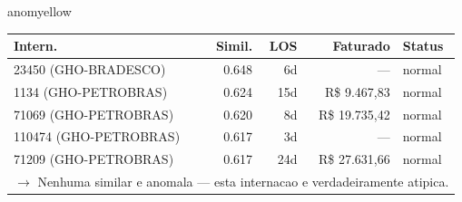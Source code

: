 \documentclass[a4paper,10pt]{article}
\begin{document}
\begin{anomalycard}[Internacao 105631 | GHO-PETROBRAS | MODERADO (z=2.13)]{anomyellow}
\begin{tabular}{l r r r l}\toprule\textbf{Intern.} & \textbf{Simil.} & \textbf{LOS} & \textbf{Faturado} & \textbf{Status} \\\midrule
23450 (GHO-BRADESCO) & 0.648 & 6d & --- & \textcolor{jcubeblue}{normal} \\
1134 (GHO-PETROBRAS) & 0.624 & 15d & R\$ 9.467,83 & \textcolor{jcubeblue}{normal} \\
71069 (GHO-PETROBRAS) & 0.620 & 8d & R\$ 19.735,42 & \textcolor{jcubeblue}{normal} \\
110474 (GHO-PETROBRAS) & 0.617 & 3d & --- & \textcolor{jcubeblue}{normal} \\
71209 (GHO-PETROBRAS) & 0.617 & 24d & R\$ 27.631,66 & \textcolor{jcubeblue}{normal} \\
\multicolumn{5}{l}{\textcolor{jcubeblue}{\small $\rightarrow$ Nenhuma similar e anomala --- esta internacao e verdadeiramente atipica.}} \\
\bottomrule\end{tabular}


\end{anomalycard}

\newpage
\end{document}
